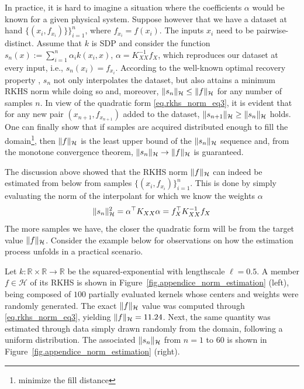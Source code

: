 In practice, it is hard to imagine a situation where the coefficients $\alpha$ would be known for a given physical system. Suppose however that we have a dataset at hand $\{(x_i,f_{x_i})\}\}_{i=1}^n$, where $f_{x_i} = f(x_i)$. The inputs $x_i$ need to be pairwise-distinct. Assume that $k$ is SDP and consider the function $s_n(x) := \sum_{i=1}^n \alpha_i k(x_i,x)$, $\alpha = K_{XX}^{-1} f_X$, which reproduces our dataset at every input, i.e., $s_n(x_i) = f_{x_i}$. According to the well-known optimal recovery property \cite[§8.3]{iske2018approximation}, $s_n$ not only interpolates the dataset, but also attains a minimum RKHS norm while doing so and, moreover, $\Vert s_n \Vert_{\mathcal{H}} \leq \Vert f \Vert_{\mathcal{H}}$ for any number of samples $n$. In view of the quadratic form \eqref{eq.rkhs_norm_eq3}, it is evident that for any new pair $(x_{n+1},f_{x_{n+1}})$ added to the dataset, $\Vert s_{n+1} \Vert_{\mathcal{H}} \geq \Vert s_n \Vert_{\mathcal{H}}$ holds. One can finally show that if samples are acquired distributed enough to fill the domain\footnote{minimize the fill distance}, then $\Vert f \Vert_{\mathcal{H}}$ is the least upper bound of the $\Vert s_n \Vert_{\mathcal{H}}$ sequence and, from the monotone convergence theorem, $\Vert s_n \Vert_{\mathcal{H}} \rightarrow \Vert f \Vert_{\mathcal{H}}$ is guaranteed.

The discussion above showed that the RKHS norm $\Vert f \Vert_{\mathcal{H}}$ can indeed be estimated from below from samples $\{(x_i,f_{x_i})\}_{i=1}^n$. This is done by simply evaluating the norm of the interpolant for which we know the weights $\alpha$
\begin{equation}
\Vert s_n \Vert_{\mathcal{H}}^2 = \alpha^\top K_{XX} \alpha = f_{X}^\top K_{XX}^{-1} f_{X}
\end{equation}
The more samples we have, the closer the quadratic form will be from the target value $\Vert f \Vert_{\mathcal{H}}$. Consider the example below for observations on how the estimation process unfolds in a practical scenario.

Let $k:\mathbb{R}\times \mathbb{R} \rightarrow \mathbb{R}$ be the squared-exponential with lengthscale $\ell = 0.5$. A member $f \in \mathcal{H}$ of its RKHS is shown in Figure~\ref{fig.appendice_norm_estimation} (left), being composed of $100$ partially evaluated kernels whose centers and weights were randomly generated. The exact $\Vert f\Vert_{\mathcal{H}}$ value was computed through \eqref{eq.rkhs_norm_eq3}, yielding $\Vert f\Vert_{\mathcal{H}} = 11.24$. Next, the same quantity was estimated through data simply drawn randomly from the domain, following a uniform distribution. The associated $\Vert s_n \Vert_{\mathcal{H}}$ from $n=1$ to $60$ is shown in Figure~\ref{fig.appendice_norm_estimation} (right).

